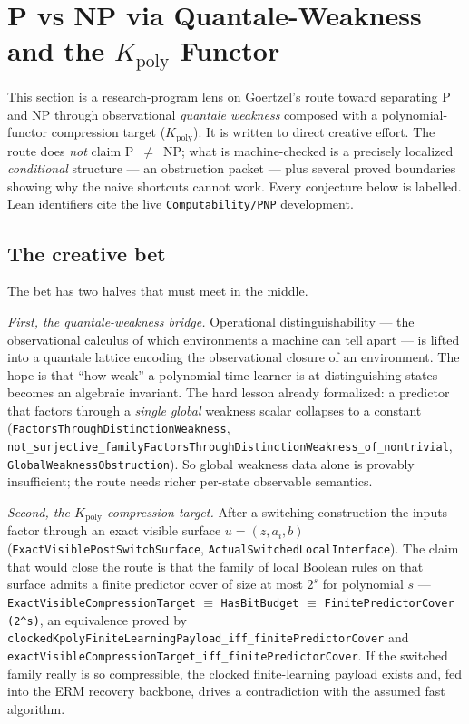 \section{P vs NP via Quantale-Weakness and the $K_{\mathrm{poly}}$ Functor}
\label{sec:goertzel-pnp-state}

This section is a research-program lens on Goertzel's route toward separating
P and NP through observational \emph{quantale weakness} composed with a
polynomial-functor compression target ($K_{\mathrm{poly}}$). It is written to
direct creative effort. The route does \emph{not} claim P~$\neq$~NP; what is
machine-checked is a precisely localized \emph{conditional} structure --- an
obstruction packet --- plus several proved boundaries showing why the naive
shortcuts cannot work. Every conjecture below is labelled. Lean identifiers cite
the live \texttt{Computability/PNP} development.

\subsection{The creative bet}

The bet has two halves that must meet in the middle.

\emph{First, the quantale-weakness bridge.} Operational distinguishability ---
the observational calculus of which environments a machine can tell apart ---
is lifted into a quantale lattice encoding the observational closure of an
environment. The hope is that ``how weak'' a polynomial-time learner is at
distinguishing states becomes an algebraic invariant. The hard lesson already
formalized: a predictor that factors through a \emph{single global} weakness
scalar collapses to a constant
(\verb|FactorsThroughDistinctionWeakness|,
\verb|not_surjective_familyFactorsThroughDistinctionWeakness_of_nontrivial|,
\verb|GlobalWeaknessObstruction|). So global weakness data alone is provably
insufficient; the route needs richer per-state observable semantics.

\emph{Second, the $K_{\mathrm{poly}}$ compression target.} After a switching
construction the inputs factor through an exact visible surface
$u=(z,a_i,b)$ (\verb|ExactVisiblePostSwitchSurface|,
\verb|ActualSwitchedLocalInterface|). The claim that would close the route is
that the family of local Boolean rules on that surface admits a finite predictor
cover of size at most $2^s$ for polynomial $s$ ---
\verb|ExactVisibleCompressionTarget| $\equiv$ \verb|HasBitBudget| $\equiv$
\verb|FinitePredictorCover (2^s)|, an equivalence proved by
\verb|clockedKpolyFiniteLearningPayload_iff_finitePredictorCover| and
\verb|exactVisibleCompressionTarget_iff_finitePredictorCover|. If the switched
family really is so compressible, the clocked finite-learning payload exists and,
fed into the ERM recovery backbone, drives a contradiction with the assumed
fast algorithm.

